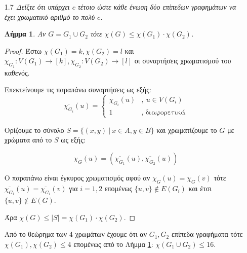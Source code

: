 \documentclass[a4paper, oneside, 11pt]{article}
\newtheorem{lm}[thm]{Λήμμα}
\newtheorem{obsrv}[thm]{Παρατήρηση}
\theoremstyle{definition}
\begin{document}
\begin{enumerate}
\begin{proof}
      Συνεπώς $\Delta(G) \geq d(u) = 4$.
   \end{proof}

   \begin{obsrv}
      \label{lm1.6.2}
      Αν $\Delta(G) \leq 3$ τότε $\Delta(L(G)) \leq 4$.
   \end{obsrv}
   \begin{proof}
      Έστω ότι υπήρχε ακμή $e = \{u, v\} \in E(G)$ η οποία να έχει κοινό
      άκρο με τουλάχιστον 5 άλλες ακμές στο $G$. Αυτό σημαίνει ότι
      σε ένα από τα άκρα της $e$, έστω στο $u$, θα προσπίπτουν τουλάχιστον
      3 από αυτές τις 5 ακμες και έτσι η $u$ θα έχει βαθμό τουλάχιστον
      4 το οποίο είναι άτοπο.
   \end{proof}

   \item[1.7] \emph{Δείξτε ότι υπάρχει $c$ τέτοιο ώστε κάθε ένωση δύο επίπεδων
              γραφημάτων να έχει χρωματικό αριθμό το πολύ $c$.}
   
   \begin{lm}
      \label{lm1.7.1}
      Αν $G = G_1 \cup G_2$ τότε $\chi(G) \leq \chi(G_1) \cdot \chi(G_2)$.
   \end{lm}
   \begin{proof}
      Έστω $\chi(G_1) = k, \chi(G_2) = l$
      και $\chi_{G_1} : V(G_1) \rightarrow [k],
      \chi_{G_2} : V(G_2) \rightarrow [l]$ οι συναρτήσεις
      χρωματισμού του καθενός.
      
      Επεκτείνουμε τις παραπάνω συναρτήσεις ως εξής:
      \[ \overline{\chi_{G_i}}(u) = \left\{
         \begin{array}{cc}
            \chi_{G_i}(u) & ,\ u \in V(G_i)\\
            1 & , \text{ διαφορετικά}
         \end{array}
         \right.
      \]

      Ορίζουμε το σύνολο $S = \{ (x, y)\ |\ x \in A, y \in B \}$ και
      χρωματίζουμε το $G$ με χρώματα από το $S$ ως εξής:

      \[ \chi_G(u) = \left( \overline{\chi_{G_1}}(u),
                     \overline{\chi_{G_2}}(u) \right) \]

      Ο παραπάνω είναι έγκυρος χρωματισμός αφού αν $\chi_G(u) = \chi_G(v)$
      τότε $\overline{\chi_{G_i}}(u) = \overline{\chi_{G_i}}(v)$
      για $i = 1, 2$ επομένως $\{ u, v \} \notin E(G_i)$ και έτσι
      $\{u, v\} \notin E(G)$.

      Άρα $\chi(G) \leq |S| = \chi(G_1) \cdot \chi(G_2)$.
   \end{proof}

   Από το θεώρημα των 4 χρωμάτων έχουμε ότι αν $G_1, G_2$ επίπεδα γραφήματα
   τότε $\chi(G_1), \chi(G_2) \leq 4$ επομένως από το Λήμμα \ref{lm1.7.1}:
   $\chi(G_1 \cup G_2) \leq 16$.
\end{enumerate}
\end{document}
